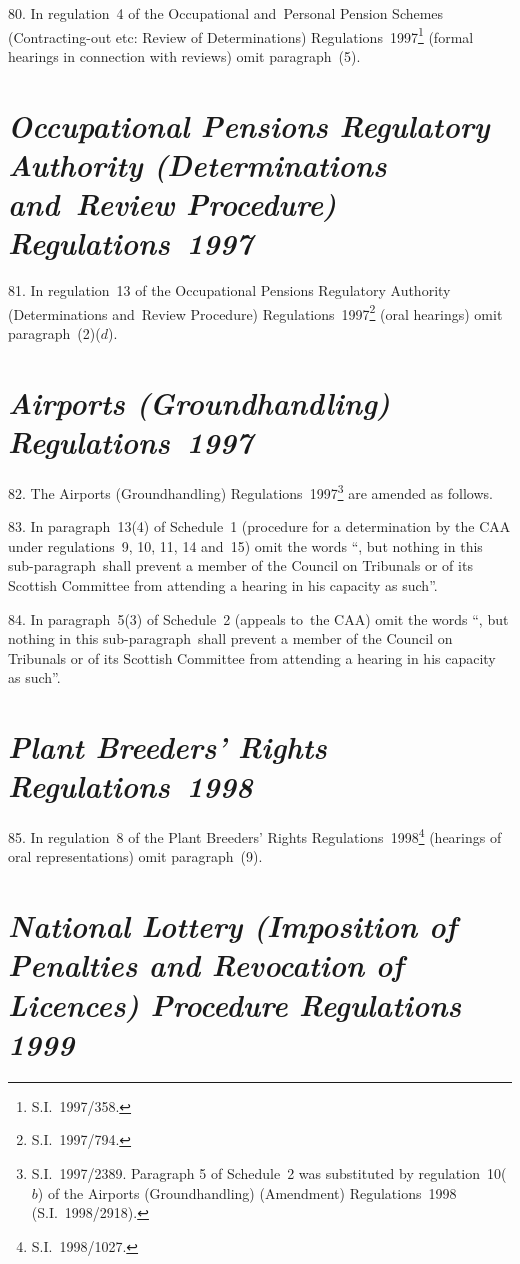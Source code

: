\documentclass[12pt,a4paper]{article}
\begin{document}
80.  In regulation~4 of the Occupational and~Personal Pension Schemes (Contracting-out etc: Review of Determinations) Regulations~1997\footnote{S.I.~1997/358.} (formal hearings in connection with reviews) omit paragraph~(5).

\section*{\itshape Occupational Pensions Regulatory Authority (Determinations and~Review Procedure) Regulations~1997}

81.  In regulation~13 of the Occupational Pensions Regulatory Authority (Determinations and~Review Procedure) Regulations~1997\footnote{S.I.~1997/794.} (oral hearings) omit paragraph~(2)($d$).

\section*{\itshape Airports (Groundhandling) Regulations~1997}

82.  The Airports (Groundhandling) Regulations~1997\footnote{S.I.~1997/2389. Paragraph 5 of Schedule~2 was substituted by regulation~10($b$) of the Airports (Groundhandling) (Amendment) Regulations~1998 (S.I.~1998/2918).} are amended as follows.

\medskip

83.  In paragraph~13(4) of Schedule~1 (procedure for a determination by the CAA under regulations~9, 10, 11, 14 and~15) omit the words “, but nothing in this sub-paragraph~shall prevent a member of the Council on Tribunals or of its Scottish Committee from attending a hearing in his capacity as such”.

\medskip

84.  In paragraph~5(3) of Schedule~2 (appeals to~the CAA) omit the words “, but nothing in this sub-paragraph~shall prevent a member of the Council on Tribunals or of its Scottish Committee from attending a hearing in his capacity as such”.

\section*{\itshape Plant Breeders’ Rights Regulations~1998}

85.  In regulation~8 of the Plant Breeders’ Rights Regulations~1998\footnote{S.I.~1998/1027.} (hearings of oral representations) omit paragraph~(9).

\section*{\itshape\sloppy National Lottery (Imposition of Penalties and Revocation of Licences) Procedure Regulations 1999}
\end{document}
